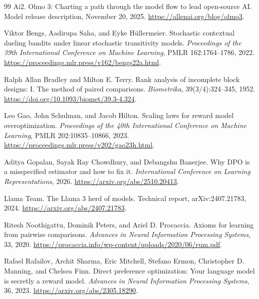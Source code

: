 \documentclass[11pt,twoside]{article}
\theoremstyle{definition}
\theoremstyle{remark}
\begin{document}
\begin{thebibliography}{99}
Ai2.
\newblock Olmo 3: Charting a path through the model flow to lead open-source AI.
\newblock Model release description, November 20, 2025.
\newblock \url{https://allenai.org/blog/olmo3}.

Viktor Bengs, Aadirupa Saha, and Eyke H\"ullermeier.
\newblock Stochastic contextual dueling bandits under linear stochastic
transitivity models.
\newblock \emph{Proceedings of the 39th International Conference on Machine
Learning}, PMLR 162:1764--1786, 2022.
\newblock \url{https://proceedings.mlr.press/v162/bengs22a.html}.

Ralph Allan Bradley and Milton E. Terry.
\newblock Rank analysis of incomplete block designs: I. The method of paired comparisons.
\newblock \emph{Biometrika}, 39(3/4):324--345, 1952.
\newblock \url{https://doi.org/10.1093/biomet/39.3-4.324}.

Leo Gao, John Schulman, and Jacob Hilton.
\newblock Scaling laws for reward model overoptimization.
\newblock \emph{Proceedings of the 40th International Conference on Machine
Learning}, PMLR 202:10835--10866, 2023.
\newblock \url{https://proceedings.mlr.press/v202/gao23h.html}.

Aditya Gopalan, Sayak Ray Chowdhury, and Debangshu Banerjee.
\newblock Why DPO is a misspecified estimator and how to fix it.
\newblock \emph{International Conference on Learning Representations}, 2026.
\newblock \url{https://arxiv.org/abs/2510.20413}.

Llama Team.
\newblock The Llama 3 herd of models.
\newblock Technical report, arXiv:2407.21783, 2024.
\newblock \url{https://arxiv.org/abs/2407.21783}.

Ritesh Noothigattu, Dominik Peters, and Ariel D. Procaccia.
\newblock Axioms for learning from pairwise comparisons.
\newblock \emph{Advances in Neural Information Processing Systems}, 33, 2020.
\newblock \url{https://procaccia.info/wp-content/uploads/2020/06/rum.pdf}.

Rafael Rafailov, Archit Sharma, Eric Mitchell, Stefano Ermon,
Christopher D. Manning, and Chelsea Finn.
\newblock Direct preference optimization: Your language model is secretly a reward model.
\newblock \emph{Advances in Neural Information Processing Systems}, 36, 2023.
\newblock \url{https://arxiv.org/abs/2305.18290}.


\end{thebibliography}
\end{document}
